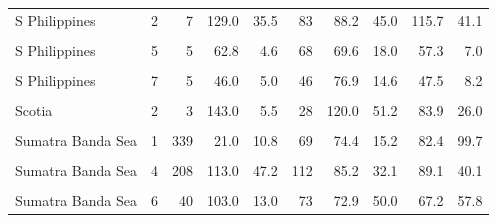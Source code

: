 \begin{ThreePartTable}
\begin{longtable}[t]{lrrrrrrrrr}
S Philippines & 2 & 7 & 129.0 & 35.5 & 83 & 88.2 & 45.0 & 115.7 & 41.1\\
\cellcolor{gray!6}{S Philippines} & \cellcolor{gray!6}{4} & \cellcolor{gray!6}{4} & \cellcolor{gray!6}{97.0} & \cellcolor{gray!6}{105.8} & \cellcolor{gray!6}{62} & \cellcolor{gray!6}{73.0} & \cellcolor{gray!6}{24.7} & \cellcolor{gray!6}{57.9} & \cellcolor{gray!6}{23.2}\\
S Philippines & 5 & 5 & 62.8 & 4.6 & 68 & 69.6 & 18.0 & 57.3 & 7.0\\
\cellcolor{gray!6}{S Philippines} & \cellcolor{gray!6}{6} & \cellcolor{gray!6}{4} & \cellcolor{gray!6}{52.9} & \cellcolor{gray!6}{24.3} & \cellcolor{gray!6}{72} & \cellcolor{gray!6}{76.8} & \cellcolor{gray!6}{27.4} & \cellcolor{gray!6}{53.5} & \cellcolor{gray!6}{11.2}\\
S Philippines & 7 & 5 & 46.0 & 5.0 & 46 & 76.9 & 14.6 & 47.5 & 8.2\\
\cellcolor{gray!6}{S Philippines} & \cellcolor{gray!6}{8} & \cellcolor{gray!6}{4} & \cellcolor{gray!6}{45.5} & \cellcolor{gray!6}{7.2} & \cellcolor{gray!6}{65} & \cellcolor{gray!6}{81.4} & \cellcolor{gray!6}{18.0} & \cellcolor{gray!6}{47.3} & \cellcolor{gray!6}{6.8}\\
Scotia & 2 & 3 & 143.0 & 5.5 & 28 & 120.0 & 51.2 & 83.9 & 26.0\\
\cellcolor{gray!6}{Scotia} & \cellcolor{gray!6}{3} & \cellcolor{gray!6}{9} & \cellcolor{gray!6}{134.0} & \cellcolor{gray!6}{37.0} & \cellcolor{gray!6}{54} & \cellcolor{gray!6}{90.2} & \cellcolor{gray!6}{38.9} & \cellcolor{gray!6}{89.6} & \cellcolor{gray!6}{28.2}\\
Sumatra Banda Sea & 1 & 339 & 21.0 & 10.8 & 69 & 74.4 & 15.2 & 82.4 & 99.7\\
\cellcolor{gray!6}{Sumatra Banda Sea} & \cellcolor{gray!6}{3} & \cellcolor{gray!6}{23} & \cellcolor{gray!6}{80.0} & \cellcolor{gray!6}{24.2} & \cellcolor{gray!6}{59} & \cellcolor{gray!6}{75.4} & \cellcolor{gray!6}{22.6} & \cellcolor{gray!6}{68.3} & \cellcolor{gray!6}{19.7}\\
Sumatra Banda Sea & 4 & 208 & 113.0 & 47.2 & 112 & 85.2 & 32.1 & 89.1 & 40.1\\
\cellcolor{gray!6}{Sumatra Banda Sea} & \cellcolor{gray!6}{5} & \cellcolor{gray!6}{192} & \cellcolor{gray!6}{123.0} & \cellcolor{gray!6}{33.2} & \cellcolor{gray!6}{95} & \cellcolor{gray!6}{85.4} & \cellcolor{gray!6}{36.9} & \cellcolor{gray!6}{97.9} & \cellcolor{gray!6}{54.7}\\
Sumatra Banda Sea & 6 & 40 & 103.0 & 13.0 & 73 & 72.9 & 50.0 & 67.2 & 57.8\\

\end{longtable}
\end{ThreePartTable}
